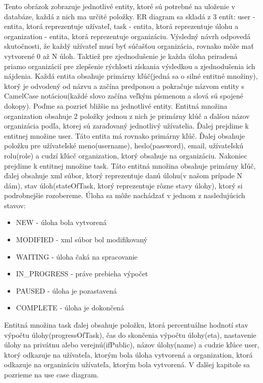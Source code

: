 Tento obrázok zobrazuje jednotlivé entity, ktoré sú potrebné na uloženie v databáze, každá z nich ma určité položky. ER diagram sa skladá z 3 entít: user - entita, ktorá reprezentuje užívateľ, task - entita, ktorá reprezentuje úlohu a organization - entita, ktorá reprezentuje organizáciu. Výsledný návrh odpovedá skutočnosti, že každý užívateľ musí byť súčašťou organizácia, rovnako môže mať vytvorené 0 až N úloh. Taktiež pre zjednodušenie je každa úloha priradená priamo organizácií pre zlepšenie rýchlosti získania výsledkou a zjednodušenia ich nájdenia. Každá entita obsahuje primárny kľúč(jedná sa o silné entitné množiny), ktorý je odvodený od názvu a začína predponou  a pokračuje názvom entity s CamelCase notáciou(každé slovo začína veľkým písmenom a slová sú spojené dokopy). Poďme sa pozrieť bližšie na jednotlivé entity. Entitná množina organization obsahuje 2 položky jednou z nich je primárny klúč a ďalšou názov organizácia podľa, ktorej sú zaraďovaný jednotlivý užívatelia. Ďalej prejdime k entitnej množine user. Táto entita má rovnako primárny kľúč. Ďalej obsahuje položku pre užívateľské meno(username), heslo(password), email, užívateľskú rolu(role) a cudzí kľúcč organization, ktorý obsahuje na organizáciu. Nakoniec prejdime k entitnej množine task. Táto entitná množina obsahuje primárny kľúč, ďalej obsahuje xml súbor, ktorý reprezentuje danú úlohu(v našom prípade N dám), stav úloh(stateOfTask, ktorý reprezentuje rôzne stavy úlohy), ktorý si podrobnejšie rozobereme. Úloha sa môže nachádzať v jednom z nasledujúcich stavov:
\begin{itemize}
\item NEW - úloha bola vytvorená
\item MODIFIED - xml súbor bol modifikovaný
\item WAITING - úloha čaká na spracovanie
\item IN\_PROGRESS - práve prebieha výpočet
\item PAUSED - úloha je pozastavená
\item COMPLETE - úloha je dokončená
\end{itemize}
Entitná množina task ďalej obsahuje položku, ktorá percentuálne hodnotí stav výpočtu úlohy(progressOfTask), čas do skončenia výpočtu úlohy(eta), nastavenie úlohy na privátnu alebo verejnú(ifPublic), názov úlohy(name) a cudzie kľúce user, ktorý odkazuje na užívateľa, ktorým bola úloha vytvorená a organization, ktorá odkazuje na organizáciu užívateľa, ktorým bola vytvorená. V ďalšej kapitole sa pozrieme na use case diagram.

